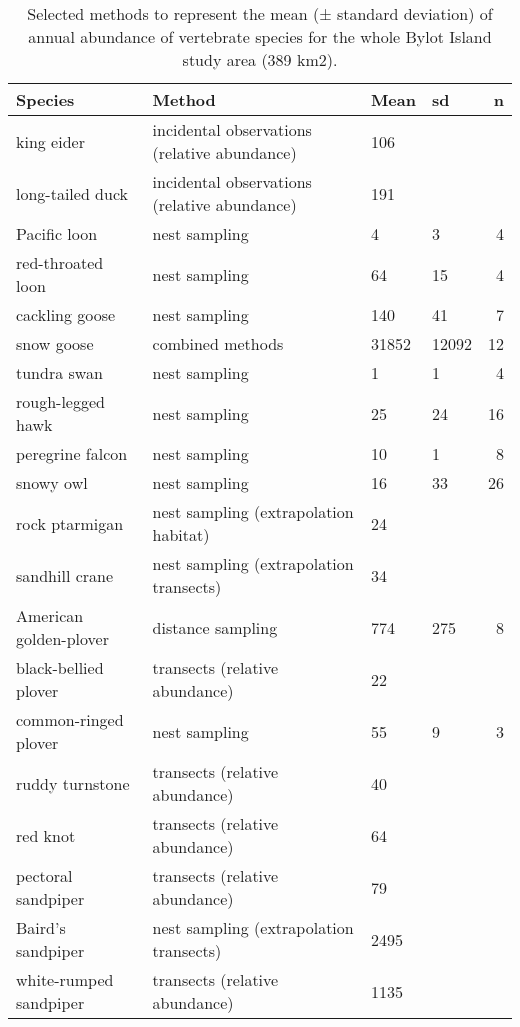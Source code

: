 \begin{table}[ht]
\centering
\caption{Selected methods to represent the mean (± standard deviation) of annual abundance of vertebrate species for the whole Bylot Island study area (389 km2).} 
\label{table:species_mean_abudance}
\begingroup\fontsize{8pt}{10pt}\selectfont
\begin{tabularx}{0.85\textwidth}{llllr}
  \hline
Species & Method & Mean & sd & n \\ 
  \hline
king eider & incidental observations (relative abundance) & 106 &  &  \\ 
  long-tailed duck & incidental observations (relative abundance) & 191 &  &  \\ 
  Pacific loon & nest sampling & 4 & 3 &   4 \\ 
  red-throated loon & nest sampling & 64 & 15 &   4 \\ 
  cackling goose & nest sampling & 140 & 41 &   7 \\ 
  snow goose & combined methods & 31852 & 12092 &  12 \\ 
  tundra swan & nest sampling & 1 & 1 &   4 \\ 
  rough-legged hawk & nest sampling & 25 & 24 &  16 \\ 
  peregrine falcon & nest sampling & 10 & 1 &   8 \\ 
  snowy owl & nest sampling & 16 & 33 &  26 \\ 
  rock ptarmigan & nest sampling (extrapolation habitat) & 24 &  &  \\ 
  sandhill crane & nest sampling (extrapolation transects) & 34 &  &  \\ 
  American golden-plover & distance sampling & 774 & 275 &   8 \\ 
  black-bellied plover & transects (relative abundance) & 22 &  &  \\ 
  common-ringed plover & nest sampling & 55 & 9 &   3 \\ 
  ruddy turnstone & transects (relative abundance) & 40 &  &  \\ 
  red knot & transects (relative abundance) & 64 &  &  \\ 
  pectoral sandpiper & transects (relative abundance) & 79 &  &  \\ 
  Baird's sandpiper & nest sampling (extrapolation transects) & 2495 &  &  \\ 
  white-rumped sandpiper & transects (relative abundance) & 1135 &  &  \\ 

\end{tabularx}
\end{table}
